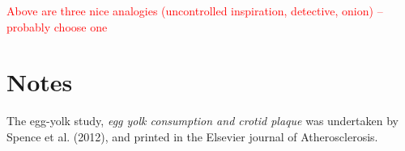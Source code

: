 \textcolor{red}{Above are three nice analogies (uncontrolled inspiration, detective, onion) -- probably choose one}



\section{Notes}

The egg-yolk study, \textit{egg yolk consumption and crotid plaque} was undertaken by Spence et al. (2012), and printed in the Elsevier journal of Atherosclerosis. 



